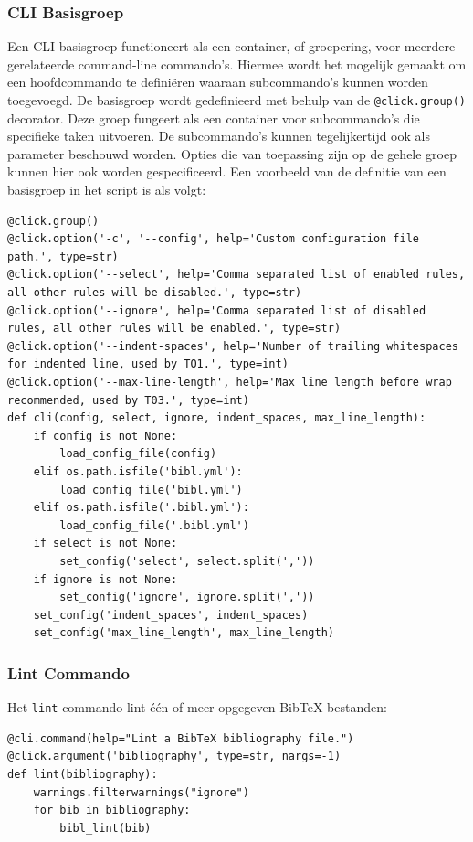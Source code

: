 \subsubsection{CLI Basisgroep}

Een CLI basisgroep functioneert als een container, of groepering, voor meerdere gerelateerde command-line commando's. Hiermee wordt het mogelijk gemaakt om een hoofdcommando te definiëren waaraan subcommando's kunnen worden toegevoegd.
De basisgroep wordt gedefinieerd met behulp van de \texttt{@click.group()} decorator. Deze groep fungeert als een container voor subcommando's die specifieke taken uitvoeren. De subcommando's kunnen tegelijkertijd ook als parameter beschouwd worden. Opties die van toepassing zijn op de gehele groep kunnen hier ook worden gespecificeerd. Een voorbeeld van de definitie van een basisgroep in het script is als volgt:

\begin{verbatim}
@click.group()
@click.option('-c', '--config', help='Custom configuration file path.', type=str)
@click.option('--select', help='Comma separated list of enabled rules, all other rules will be disabled.', type=str)
@click.option('--ignore', help='Comma separated list of disabled rules, all other rules will be enabled.', type=str)
@click.option('--indent-spaces', help='Number of trailing whitespaces for indented line, used by TO1.', type=int)
@click.option('--max-line-length', help='Max line length before wrap recommended, used by T03.', type=int)
def cli(config, select, ignore, indent_spaces, max_line_length):
    if config is not None:
        load_config_file(config)
    elif os.path.isfile('bibl.yml'):
        load_config_file('bibl.yml')
    elif os.path.isfile('.bibl.yml'):
        load_config_file('.bibl.yml')
    if select is not None:
        set_config('select', select.split(','))
    if ignore is not None:
        set_config('ignore', ignore.split(','))
    set_config('indent_spaces', indent_spaces)
    set_config('max_line_length', max_line_length)
\end{verbatim}

\subsubsection{Lint Commando}

Het \texttt{lint} commando lint één of meer opgegeven BibTeX-bestanden:

\begin{verbatim}
@cli.command(help="Lint a BibTeX bibliography file.")
@click.argument('bibliography', type=str, nargs=-1)
def lint(bibliography):
    warnings.filterwarnings("ignore")
    for bib in bibliography:
        bibl_lint(bib)
\end{verbatim}

